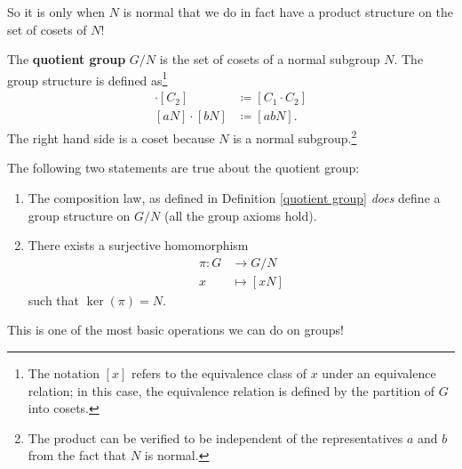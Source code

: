 So it is only when $N$ is normal that we do in fact have a product structure on the set of cosets of $N$!
\begin{definition}\label{quotient group}
The \textbf{quotient group} $G/N$ is the set of cosets of a normal subgroup $N.$ The group structure is defined as\footnote{The notation $[x]$ refers to the equivalence class of $x$ under an equivalence relation; in this case, the equivalence relation is defined by the partition of $G$ into cosets.}
\begin{align*}
[C_1] \cdot [C_2] &\coloneqq [C_1 \cdot C_2] \\
[aN] \cdot [bN] &\coloneqq [abN].
\end{align*}
The right hand side is a coset because $N$ is a normal subgroup.\footnote{The product can be verified to be independent of the representatives $a$ and $b$ from the fact that $N$ is normal.} %
\end{definition}

\begin{theorem}\label{quotient group composition}
The following two statements are true about the quotient group:
\begin{enumerate}
    \item The composition law, as defined in Definition \ref{quotient group} \emph{does} define a group structure on $G/N$ (all the group axioms hold).
    \item There exists a surjective homomorphism 
    \begin{align*}
    \pi: G &\rightarrow G/N \\
    x &\mapsto [xN]
    \end{align*}
    such that $\ker(\pi) = N.$
\end{enumerate}
\end{theorem}

This is one of the most basic operations we can do on groups! 

